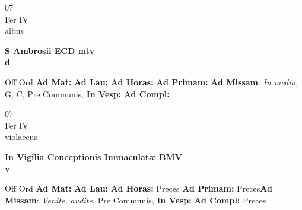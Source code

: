 \documentclass[10pt, openany]{book}
\begin{document}
    \begin{center}
        \begin{minipage}{3.5in}
            \vspace{2em}
            \begin{minipage}{0.5in}
                {\Huge 07} \\
                {\normalsize Fer IV} \\
                {\normalsize albus}
            \end{minipage}
            \begin{minipage}{3.0in}
                \textbf{ \large S Ambrosii ECD mtv \\
                \textnormal{\normalsize d}} \\ 
            \end{minipage}
            \begin{justify}Off Ord
                \textbf{Ad Mat: }
                \textbf{Ad Lau: }
                \textbf{Ad Horas: }
                \textbf{Ad Primam: }\textbf{Ad Missam}: \textit{In medio,} G, C, Pre Communis,  
                \textbf{In Vesp: }
                \textbf{Ad Compl: }
            \end{justify}
        \end{minipage}
    \end{center}

    \begin{center}
        \begin{minipage}{3.5in}
            \vspace{2em}
            \begin{minipage}{0.5in}
                {\Huge 07} \\
                {\normalsize Fer IV} \\
                {\normalsize violaceus}
            \end{minipage}
            \begin{minipage}{3.0in}
                \textbf{ \large In Vigilia Conceptionis Immaculatæ BMV \\
                \textnormal{\normalsize v}} \\ 
            \end{minipage}
            \begin{justify}Off Ord
                \textbf{Ad Mat: }
                \textbf{Ad Lau: }
                \textbf{Ad Horas: }Preces
                \textbf{Ad Primam: }Preces\textbf{Ad Missam}: \textit{Venite, audite,} Pre Communis,  
                \textbf{In Vesp: }
                \textbf{Ad Compl: }Preces
            \end{justify}
        \end{minipage}
    \end{center}
\end{document}
